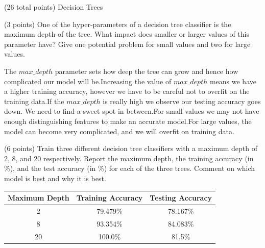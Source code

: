 \documentclass[12pt]{article}
\begin{document}
\begin{question}{(26 total points) Decision Trees}
%
%
\begin{subquestion}{(3 points) 
One of the hyper-parameters of a decision tree classifier is the maximum depth of the tree. 
What impact does smaller or larger values of this parameter have? Give one potential problem for small values and two for large values. 
}


\begin{answerbox}{10em}
The $max\_depth$ parameter sets how deep the tree can grow and hence how complicated our model will be.Increasing the value of $max\_depth$ means we have a higher training accuracy, however we have to be careful not to overfit on the training data.If the $max\_depth$ is really high we observe our testing accuracy goes down. We need to find a sweet spot in between.For small values we may not have enough distinguishing features to make an accurate model.For large values, the model can become very complicated, and we will overfit on training data.
\end{answerbox}



\end{subquestion}


%
%
\begin{subquestion}{(6 points) 
Train three different decision tree classifiers with a maximum depth of 2, 8, and 20 respectively.
Report the maximum depth, the training accuracy (in \%), and the test accuracy (in \%) for each of the three trees.
Comment on which model is best and why it is best. \\
}


\begin{answerbox}{20em}
\begin{center}
    \begin{tabular}{|c|c|c|}
    \hline
    Maximum Depth & Training Accuracy & Testing Accuracy \\ \hline
    2 & 79.479\% & 78.167\% \\
    8 & 93.354\% & 84.083\% \\
    20 & 100.0\% & 81.5\% \\
    \hline
    \end{tabular}
\end{center}


\end{answerbox}
\end{subquestion}
\end{question}
\end{document}
